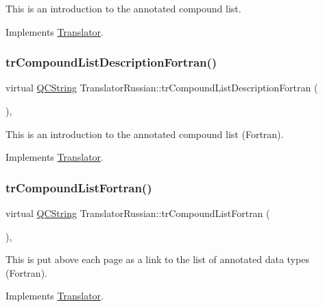 This is an introduction to the annotated compound list. 

Implements \mbox{\hyperlink{class_translator}{Translator}}.

\mbox{\label{class_translator_russian_a1087e0711be2aa90dd461f5db3c561f5}} 
\subsubsection{\texorpdfstring{trCompoundListDescriptionFortran()}{trCompoundListDescriptionFortran()}}
{\footnotesize\ttfamily virtual \mbox{\hyperlink{class_q_c_string}{Q\+C\+String}} Translator\+Russian\+::tr\+Compound\+List\+Description\+Fortran (\begin{DoxyParamCaption}{ }\end{DoxyParamCaption})\hspace{0.3cm}{\ttfamily [inline]}, {\ttfamily [virtual]}}

This is an introduction to the annotated compound list (Fortran). 

Implements \mbox{\hyperlink{class_translator}{Translator}}.

\mbox{\label{class_translator_russian_ad60046a0b8ac7732521bd30fb46631de}} 
\subsubsection{\texorpdfstring{trCompoundListFortran()}{trCompoundListFortran()}}
{\footnotesize\ttfamily virtual \mbox{\hyperlink{class_q_c_string}{Q\+C\+String}} Translator\+Russian\+::tr\+Compound\+List\+Fortran (\begin{DoxyParamCaption}{ }\end{DoxyParamCaption})\hspace{0.3cm}{\ttfamily [inline]}, {\ttfamily [virtual]}}

This is put above each page as a link to the list of annotated data types (Fortran). 

Implements \mbox{\hyperlink{class_translator}{Translator}}.


